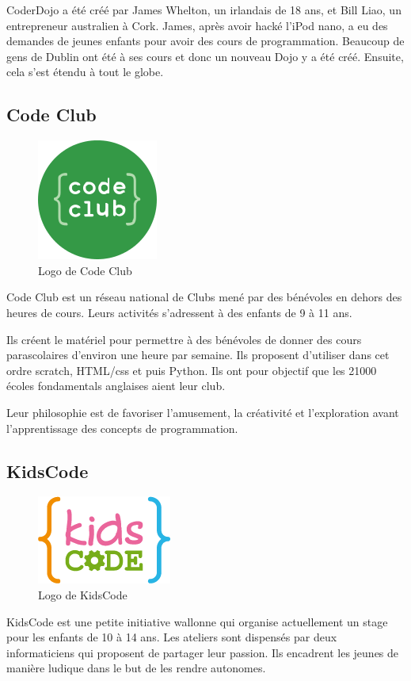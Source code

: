CoderDojo a été créé par James Whelton, un irlandais de 18 ans, et Bill Liao, un entrepreneur australien à Cork. James, après avoir hacké l'iPod nano, a eu des demandes de jeunes enfants pour avoir des cours de programmation. Beaucoup de gens de Dublin ont été à ses cours et donc un nouveau Dojo y a été créé. Ensuite, cela s'est étendu à tout le globe.

\subsection{Code Club}
\begin{figure}[!ht]
  \begin{center}
    \includegraphics[scale=0.3]{content/5-related_work/images/club}
    \caption{Logo de Code Club}
    \label{fig:code club}
  \end{center}
\end{figure}
Code Club\cite{codeclub-about} est un réseau national de Clubs mené par des bénévoles en dehors des heures de cours. Leurs activités s'adressent à des enfants de 9 à 11 ans.

Ils créent le matériel pour permettre à des bénévoles de donner des cours parascolaires d'environ une heure par semaine. Ils proposent d'utiliser dans cet ordre scratch, HTML/css et puis Python. Ils ont pour objectif que les 21000 écoles \glspl{fondamental} anglaises aient leur club.

Leur philosophie est de favoriser l'amusement, la créativité et l'exploration avant l'apprentissage des concepts de programmation.

\subsection{KidsCode}
\label{init-kidscode}
\begin{figure}[!ht]
  \begin{center}
    \includegraphics[scale=0.5]{content/5-related_work/images/kidscode}
    \caption{Logo de KidsCode}
    \label{fig:kidscode}
  \end{center}
\end{figure}
KidsCode \cite{kidscode} est une petite initiative wallonne qui organise actuellement un stage pour les enfants de 10 à 14 ans. Les ateliers sont dispensés par deux informaticiens qui proposent de partager leur passion. Ils encadrent les jeunes de manière ludique dans le but de les rendre autonomes.

